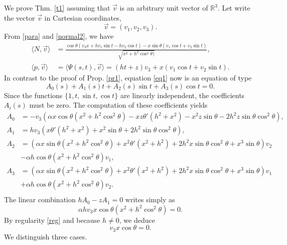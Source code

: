 \documentclass[a4paper,12pt]{amsart}
\theoremstyle{definition}
\def\r{\mathbb R}
\begin{document}
We prove Thm. \ref{t1} assuming that $\vec{v}$ is an arbitrary unit vector of $\r^3$. Let write the vector $\vec{v}$ in Cartesian coordinates, 
$$\vec{v}=(v_1,v_2,v_3).$$
  From \eqref{para} and \eqref{normal2}, we have
\begin{equation*}
\begin{split}
\langle N,\vec{v}\rangle&=\frac{\cos\theta (v_3 x+h v_1 \sin t-h v_2 \cos t)-x \sin\theta (v_1 \cos t+v_2 \sin t)}{\sqrt{x^2+h^2 \cos ^2 \theta  )}},\\
\langle p,\vec{v}\rangle&=\langle \Psi(s,t),\vec{v}\rangle=(h t+z)v_3+x(v_1\cos t+v_2\sin t).
\end{split}
\end{equation*}
In contrast to the proof of Prop. \ref{pr1}, equation  \eqref{eq1} now is an equation of type
$$A_0(s)+A_1(s)t+A_2(s)\sin t+A_3(s)\cos t=0.$$
Since the functions $\{1,t,\sin t,\cos t\}$ are linearly independent, the coefficients $A_i(s)$ must be zero. The computation of these coefficients yields
\begin{equation*}
\begin{split}
A_0&=-v_3 \left(\alpha x\cos\theta(x^2+ h^2  \cos ^2\theta)-xz\theta'(h^2+x^2)-x^2 z \sin \theta-2 h^2 z \sin \theta \cos ^2\theta\right), \\
A_1&=h v_3 \left(  x \theta '(h^2+x^2)+x^2 \sin \theta+2 h^2 \sin \theta \cos ^2\theta\right), \\
A_2&= \left( \alpha x\sin\theta(x^2+ h^2  \cos ^2\theta)+x^2\theta'(x^2+h^2) +2 h^2   x \sin \theta \cos ^2\theta + x^3 \sin \theta\right)v_2\\
& -\alpha h\cos\theta(   x^2  +   h^2   \cos ^2\theta)v_1,\\
A_3&= \left( \alpha x\sin\theta(x^2+ h^2  \cos ^2\theta)+x^2\theta'(x^2+h^2)+2 h^2  x \sin \theta \cos ^2\theta  +  x^3 \sin \theta\right)v_1\\
&+ \alpha  h \cos\theta(x^2 +   h^2  \cos ^2\theta)v_2.\\
\end{split}
\end{equation*}
The linear combination $hA_0-z A_1=0$ writes simply as
$$ \alpha  h v_3x \cos\theta   (x^2+h^2 \cos ^2 \theta  )=0.$$ 
By regularity \eqref{reg}  and because $h\not=0$, we deduce 
$$v_3x \cos\theta=0.$$
We distinguish three cases.
\end{document}
